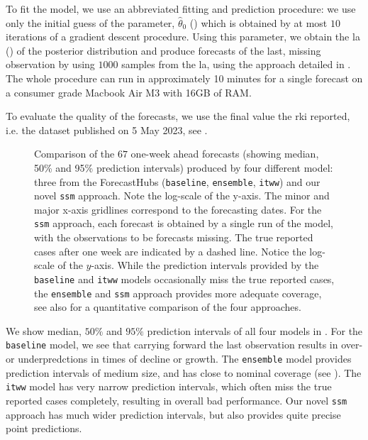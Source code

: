 To fit the model, we use an abbreviated fitting and prediction procedure: we use only the initial guess of the parameter, $\hat\theta_{0}$ () which is obtained by at most $10$ iterations of a gradient descent procedure. Using this parameter, we obtain the \gls{la} () of the posterior distribution and produce forecasts of the last, missing observation by using $1000$ samples from the \gls{la}, using the approach detailed in . The whole procedure can run in approximately 10 minutes for a single forecast on a consumer grade Macbook Air M3 with 16GB of RAM. 

To evaluate the quality of the forecasts, we use the final value the \gls{rki} reported, i.e. the dataset published on 5 May 2023, see . 

\begin{figure}
    \resizebox{\textwidth}{!}{%
    }
    \caption{Comparison of the $67$ one-week ahead forecasts (showing median, 50\% and 95\% prediction intervals) produced by four different model: three from the ForecastHubs (\texttt{baseline}, \texttt{ensemble}, \texttt{itww}) and our novel \texttt{ssm} approach. Note the log-scale of the y-axis. The minor and major x-axis gridlines correspond to the forecasting dates. For the \texttt{ssm} approach, each forecast is obtained by a single run of the model, with the observations to be forecasts missing. The true reported cases after one week are indicated by a dashed line. Notice the log-scale of the $y$-axis. While the prediction intervals provided by the \texttt{baseline} and \texttt{itww} models occasionally miss the true reported cases, the \texttt{ensemble} and \texttt{ssm} approach provides more adequate coverage, see also  for a quantitative comparison of the four approaches.}

    \label{fig:regional_forecasts_comparison.tex}
\end{figure}

We show median, $50\%$ and $95\%$ prediction intervals of all four models in . 
For the \texttt{baseline} model, we see that carrying forward the last observation results in over- or underpredctions in times of decline or growth. The \texttt{ensemble} model provides prediction intervals of medium size, and has close to nominal coverage (see ). The \texttt{itww} model has very narrow prediction intervals, which often miss the true reported cases completely, resulting in overall bad performance. 
Our novel \texttt{ssm} approach has much wider prediction intervals, but also provides quite precise point predictions. 

